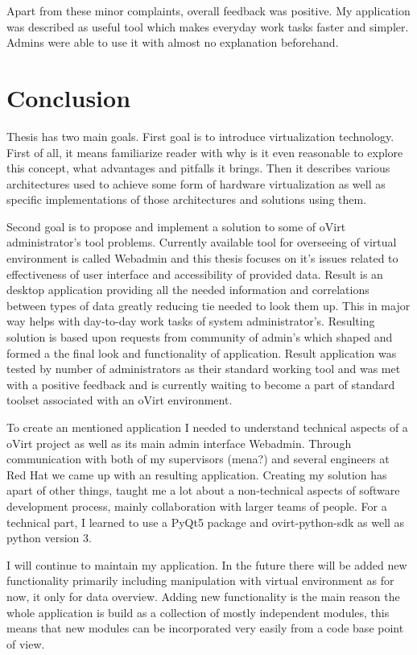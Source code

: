 Apart from these minor complaints, overall feedback was positive. My application was described as useful tool which makes everyday work tasks faster and simpler. Admins were able to use it with almost no explanation beforehand. 


\chapter{Conclusion}
Thesis has two main goals. First goal is to introduce virtualization technology. First of all, it means familiarize reader with why is it even reasonable to explore this concept, what advantages and pitfalls it brings. Then it describes various architectures used to achieve some form of hardware virtualization as well as specific implementations of those architectures and solutions using them.

Second goal is to propose and implement a solution to some of oVirt administrator's tool problems. Currently available tool for overseeing of virtual environment is called Webadmin and this thesis focuses on it's issues related to effectiveness of user interface and accessibility of provided data. Result is an desktop application providing all the needed information and correlations between types of data greatly reducing tie needed to look them up. This in major way helps with day-to-day work tasks of system administrator's. Resulting solution is based upon requests from community of admin's which shaped and formed a the final look and functionality of application. Result application was tested by number of administrators as their standard working tool and was met with a positive feedback and is currently waiting to become a part of standard toolset associated with an oVirt environment.

To create an mentioned application I needed to understand technical aspects of a oVirt project as well as its main admin interface Webadmin. Through communication with both of my supervisors (mena?) and several engineers at Red Hat we came up with an resulting application. Creating my solution has apart of other things, taught me a lot about a non-technical aspects of software development process, mainly collaboration with larger teams of people. For a technical part, I learned to use a PyQt5 package and ovirt-python-sdk as well as python version 3.

I will continue to maintain my application. In the future there will be added new functionality primarily including manipulation with virtual environment as for now, it only for data overview. Adding new functionality is the main reason the whole application is build as a collection of mostly independent modules, this means that new modules can be incorporated very easily from a code base point of view. 



